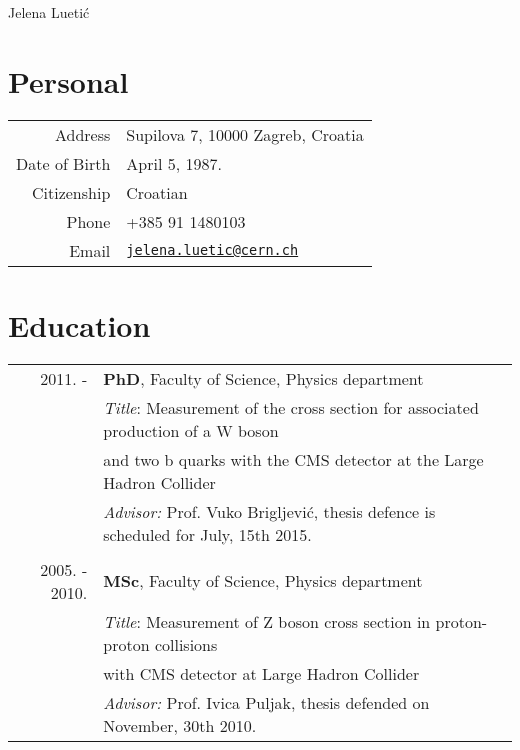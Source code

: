 \documentclass[letterpaper,12pt]{article}
\def\name{Jelena Luetić}
\begin{document}
{\huge \name}


\vspace{0.25in}


\section*{Personal}


  \begin{tabular}{r|l}
	Address & Supilova 7, 10000 Zagreb, Croatia \\   
    Date of Birth & April 5, 1987. \\
    Citizenship & Croatian \\    
    Phone & +385 91 1480103 \\
    Email & \href{mailto:jelena.luetic@cern.ch}{\tt jelena.luetic@cern.ch} \\
  \end{tabular}



\section*{Education}

\begin{table}[h!]
 \centering
\begin{tabular}{r | l}
2011. - & \textbf{PhD}, Faculty of Science, Physics department \\ & \textit{Title}: 
Measurement of the cross section for associated production of a W boson \\ & and two b quarks with the CMS detector at the Large Hadron Collider \\ &  \textit{Advisor:} Prof. Vuko Brigljević, thesis defence is scheduled for July, 15th 2015. \\ \\ 
2005. - 2010. & \textbf{MSc}, Faculty of Science, Physics department \\  & \textit{Title}: Measurement of Z boson cross section in proton-proton collisions \\ & with CMS detector at Large Hadron Collider \\ &  \textit{Advisor:} Prof. Ivica Puljak, thesis defended on November, 30th 2010. \\ 
\end{tabular}
\end{table}
\end{document}
